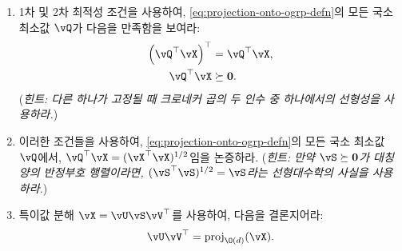 \documentclass[../../book-main_ko.tex]{subfiles}
\begin{document}
\begin{exercise}
\begin{enumerate}
        \begin{enumerate}
            \item 1차 및 2차 최적성 조건을 사용하여, \eqref{eq:projection-onto-ogrp-defn}의 모든 국소 최소값 $\vQ$가 다음을 만족함을 보여라:
            \begin{align*}
                \left( \vQ^\top \vX \right)^\top &= \vQ^\top \vX, \\
                \vQ^\top \vX &\succeq \mathbf{0}.
            \end{align*}
            (\textit{힌트: 다른 하나가 고정될 때 크로네커 곱의 두 인수 중 하나에서의 선형성을 사용하라.})
            \item 이러한 조건들을 사용하여, \eqref{eq:projection-onto-ogrp-defn}의 모든 국소 최소값 $\vQ$에서, $\vQ^\top \vX = (\vX^\top \vX)^{1/2}$임을 논증하라. (\textit{힌트: 만약 $\vS \succeq \mathbf{0}$가 대칭 양의 반정부호 행렬이라면, $(\vS^\top\vS)^{1/2} = \vS$라는 선형대수학의 사실을 사용하라.})
            \item 특이값 분해 $\vX = \vU \vS \vV^\top$를 사용하여, 다음을 결론지어라:
            \begin{equation*}
                \vU \vV^\top
                =
                \mathrm{proj}_{\O(d)}(\vX).
            \end{equation*}
        \end{enumerate}
    \end{enumerate}
\end{exercise}
\end{document}
